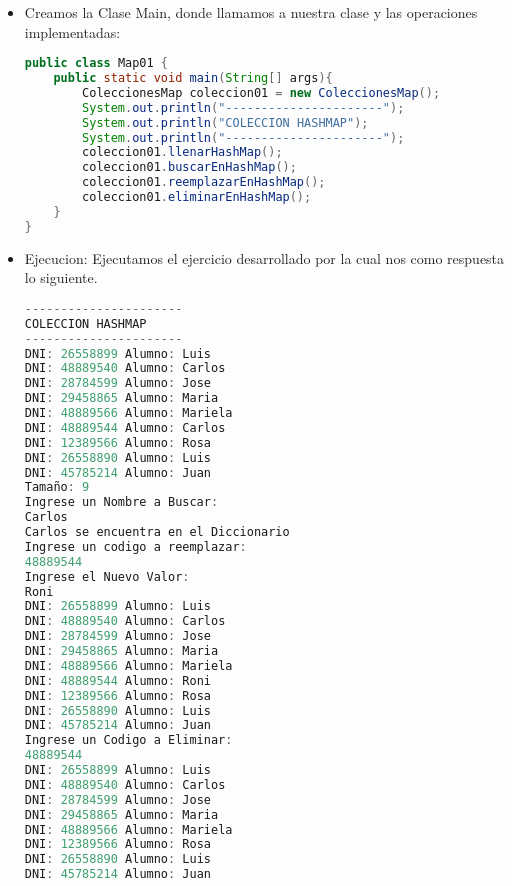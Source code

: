 \documentclass{article}
\begin{document}
\begin{itemize}
\begin{itemize}
\begin{lstlisting}[language=java]
    public void eliminarEnHashMap(){
        // eliminamos un valor en el diccionario
        System.out.println("Ingrese un Codigo a Eliminar: ");
        String llave = consola.next();
        diccionario1.remove( llave);

        for(Object key : diccionario1.keySet()){
            String llave2 = (String)key;
            String value2 = (String)diccionario1.get(llave2);
            System.out.println("DNI: "+llave2+" Alumno: "+value2);
        }
    }

    public void reemplazarEnHashMap(){
        // reemplazamos un valor en el diccionario
        System.out.println("Ingrese un codigo a reemplazar: ");
        String llave2 = consola.next();
        System.out.println("Ingrese el Nuevo Valor: ");
        String valorNuevo = consola.next();
        diccionario1.replace(llave2, valorNuevo);
        
        for(Object key3 : diccionario1.keySet()){
            String llave3 = (String)key3;
            String value3 = (String)diccionario1.get(llave3);
            System.out.println(("DNI: "+llave3+" Alumno: "+value3));
        } 
    }
}
        \end{lstlisting}
		\item Creamos la Clase Main, donde llamamos a nuestra clase y las operaciones implementadas:
        \begin{lstlisting}[language=java]
public class Map01 {
    public static void main(String[] args){
        ColeccionesMap coleccion01 = new ColeccionesMap();
        System.out.println("----------------------");
        System.out.println("COLECCION HASHMAP");
        System.out.println("----------------------");
        coleccion01.llenarHashMap();
        coleccion01.buscarEnHashMap();
        coleccion01.reemplazarEnHashMap();
        coleccion01.eliminarEnHashMap();
    }
}
        \end{lstlisting}
        \item Ejecucion: Ejecutamos el ejercicio desarrollado por la cual nos como respuesta lo siguiente.
        \begin{lstlisting}[language=java]
----------------------
COLECCION HASHMAP
----------------------
DNI: 26558899 Alumno: Luis
DNI: 48889540 Alumno: Carlos
DNI: 28784599 Alumno: Jose
DNI: 29458865 Alumno: Maria
DNI: 48889566 Alumno: Mariela
DNI: 48889544 Alumno: Carlos
DNI: 12389566 Alumno: Rosa
DNI: 26558890 Alumno: Luis
DNI: 45785214 Alumno: Juan
Tamaño: 9
Ingrese un Nombre a Buscar:
Carlos
Carlos se encuentra en el Diccionario
Ingrese un codigo a reemplazar:
48889544
Ingrese el Nuevo Valor:
Roni
DNI: 26558899 Alumno: Luis
DNI: 48889540 Alumno: Carlos
DNI: 28784599 Alumno: Jose
DNI: 29458865 Alumno: Maria
DNI: 48889566 Alumno: Mariela
DNI: 48889544 Alumno: Roni
DNI: 12389566 Alumno: Rosa
DNI: 26558890 Alumno: Luis
DNI: 45785214 Alumno: Juan
Ingrese un Codigo a Eliminar:
48889544
DNI: 26558899 Alumno: Luis
DNI: 48889540 Alumno: Carlos
DNI: 28784599 Alumno: Jose
DNI: 29458865 Alumno: Maria
DNI: 48889566 Alumno: Mariela
DNI: 12389566 Alumno: Rosa
DNI: 26558890 Alumno: Luis
DNI: 45785214 Alumno: Juan
        \end{lstlisting}


\end{itemize}
\end{itemize}
\end{document}
